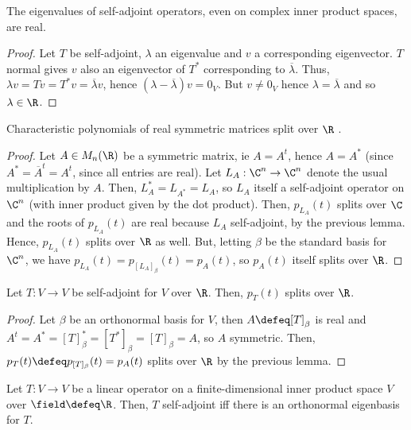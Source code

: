 \begin{lemma}
    The eigenvalues of self-adjoint operators, even on complex inner product spaces, are real.
\end{lemma}

\begin{proof}
    Let $T$ be self-adjoint, $\lambda$ an eigenvalue and $v$ a corresponding eigenvector. $T$ normal gives $v$ also an eigenvector of $T^\ast$ corresponding to $\overline{\lambda}$. Thus, $\lambda v = Tv = T^\ast v = \overline{\lambda}v$, hence $(\lambda - \overline{\lambda})v = 0_V$. But $v \neq 0_V$ hence $\lambda = \overline{\lambda}$ and so $\lambda \in \R$.
\end{proof}

\begin{lemma}
    Characteristic polynomials of real symmetric matrices split over $\R$ .
\end{lemma}

\begin{proof}
    Let $A \in M_n(\R)$ be a symmetric matrix, ie $A = A^t$, hence $A = A^\ast$ (since $A^\ast = \overline{A}^t = A^t$, since all entries are real). Let $L_A : \C^n \to \C^n$ denote the usual multiplication by $A$. Then, $L_A^\ast = L_{A^\ast} = L_A$, so $L_A$ itself a self-adjoint operator on $\C^n$ (with inner product given by the dot product). Then, $p_{L_A}(t)$ splits over $\C$ and the roots of $p_{L_A}(t)$ are real because $L_A$ self-adjoint, by the previous lemma. Hence, $p_{L_A}(t)$ splits over $\R$ as well. But, letting $\beta$ be the standard basis for $\C^n$, we have $p_{L_A}(t) = p_{[L_A]_\beta}(t) = p_A(t)$, so $p_A(t)$ itself splits over $\R$.
\end{proof}

\begin{corollary}
    Let $T : V \to V$ be self-adjoint for $V$ over $\R$. Then, $p_T(t)$ splits over $\R$.
\end{corollary}
\begin{proof}
    Let $\beta$ be an orthonormal basis for $V$, then $A \defeq [T]_\beta$ is real and $A^t = A^\ast = [T]_\beta^\ast = [T^\ast]_\beta = [T]_\beta = A$, so $A$ symmetric. Then, $p_T(t) \defeq p_{[T]_\beta}(t) = p_A(t)$ splits over $\R$ by the previous lemma.
\end{proof}

\begin{theorem}
    Let $T : V \to V$ be a linear operator on a finite-dimensional inner product space $V$ over $\field \defeq \R$. Then, $T$ self-adjoint iff  there is an orthonormal eigenbasis for $T$.
\end{theorem}

